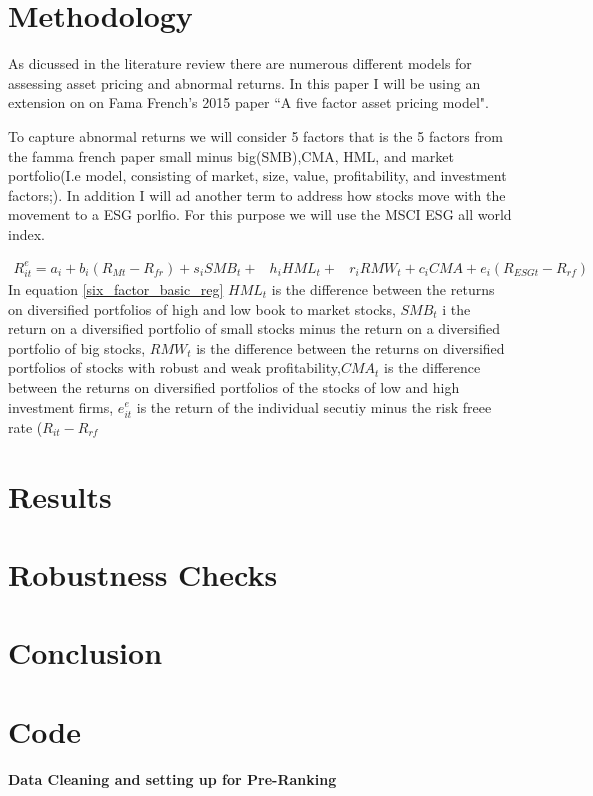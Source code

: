 \documentclass[12pt,oneside,reqno]{amsart}
\begin{document}
\section{Methodology}
\label{Methodology}
As dicussed in the literature review there are numerous different models for assessing asset pricing and abnormal returns. In this paper I will be using an extension on on Fama French's 2015 paper ``A five factor asset pricing model".

To capture abnormal returns we will consider 5 factors that is the 5 factors from the famma french paper small minus big(SMB),CMA, HML, and market portfolio(I.e model, consisting of market, size, value, profitability, and investment factors;). In addition I will ad another term to address how stocks move with the movement to a ESG porlfio. For this purpose we will use the MSCI ESG all world index. 

\begin{equation}
\begin{split}
    R_{it}^e = a_i+b_i(R_{Mt}-R_{fr})+s_iSMB_t+ & h_iHML_t+ & r_iRMW_t+c_iCMA+e_i(R_{ESG t}-R_{rf})
    \end{split}
    \label{six_factor_basic_reg}
\end{equation}
In equation \eqref{six_factor_basic_reg} $HML_{t}$ is the difference between the returns on diversified portfolios of high and low book to market stocks, $SMB_{t}$ i the return on a diversified portfolio of small stocks minus the return on a diversified portfolio of big stocks, $RMW_t$ is the difference between the returns on diversified portfolios of stocks with robust and weak profitability,$CMA_{t}$ is the difference between the returns on diversified portfolios of the stocks of low and high investment firms, $e^e_{it}$ is the return of the individual secutiy minus the risk freee rate ($R_{it}-R_{rf}$


\section{Results}
\label{Results}

\section{Robustness Checks}
\label{Robustness}

\section{Conclusion}
\label{Conclusion}
\section{Code}
\textbf{Data Cleaning and setting up for Pre-Ranking}



\end{document}
